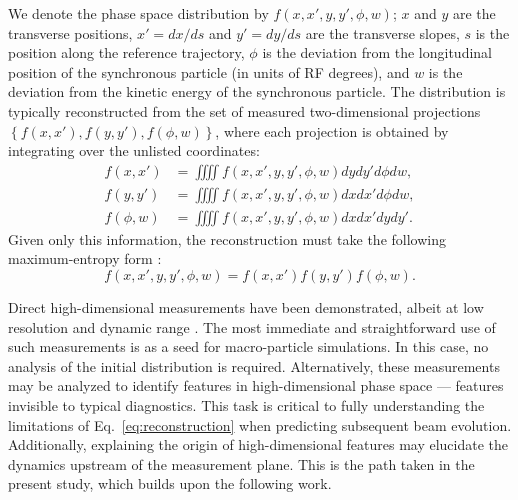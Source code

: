 \documentclass[%
 reprint,
nofootinbib,
 amsmath,amssymb,
 aps,
prstab,
]{revtex4-2}
\begin{document}
We denote the phase space distribution by $f(x, x', y, y', \phi, w)$; $x$ and $y$ are the transverse positions, $x' = dx / ds$ and $y' = dy / ds$ are the transverse slopes, $s$ is the position along the reference trajectory, $\phi$ is the deviation from the longitudinal position of the synchronous particle (in units of RF degrees), and $w$ is the deviation from the kinetic energy of the synchronous particle. The distribution is typically reconstructed from the set of measured two-dimensional projections $\left\{{f(x, x'), f(y, y'), f(\phi, w)}\right\}$, where each projection is obtained by integrating over the unlisted coordinates:
%
\begin{equation}
    \begin{aligned}
        f(x, x') &= \iiiint
        f(x, x', y, y', \phi, w) {dy}{dy'}{d\phi}{dw}, \\
        f(y, y') &= \iiiint
        f(x, x', y, y', \phi, w) {dx}{dx'}{d\phi}{dw}, \\
        f(\phi, w) &= \iiiint
        f(x, x', y, y', \phi, w) {dx}{dx'}{dy}{dy'}.
    \end{aligned}
\end{equation}
%
Given only this information, the reconstruction must take the following maximum-entropy form \cite{Wong2022-tomography}:
%
\begin{equation}\label{eq:reconstruction}
    f(x, x', y, y', \phi, w) = f(x, x') f(y, y') f(\phi, w). 
\end{equation}
%

Direct high-dimensional measurements have been demonstrated, albeit at low resolution and dynamic range \cite{Cathey2018}. The most immediate and straightforward use of such measurements is as a seed for macro-particle simulations. In this case, no analysis of the initial distribution is required. Alternatively, these measurements may be analyzed to identify features in high-dimensional phase space --- features invisible to typical diagnostics. This task is critical to fully understanding the limitations of Eq.~\eqref{eq:reconstruction} when predicting subsequent beam evolution. Additionally, explaining the origin of high-dimensional features may elucidate the dynamics upstream of the measurement plane. This is the path taken in the present study, which builds upon the following work.
\end{document}
